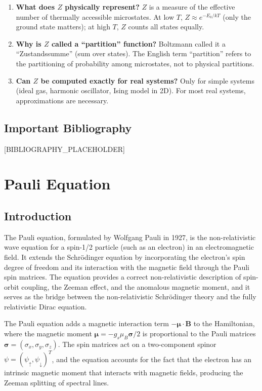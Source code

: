 \documentclass[11pt,openright]{book}
\begin{document}
\begin{enumerate}
\item \textbf{What does $Z$ physically represent?}
$Z$ is a measure of the effective number of thermally accessible microstates. At low $T$, $Z \approx e^{-E_{0}/kT}$ (only the ground state matters); at high $T$, $Z$ counts all states equally.

\item \textbf{Why is $Z$ called a ``partition'' function?}
Boltzmann called it a ``Zustandssumme'' (sum over states). The English term ``partition'' refers to the partitioning of probability among microstates, not to physical partitions.

\item \textbf{Can $Z$ be computed exactly for real systems?}
Only for simple systems (ideal gas, harmonic oscillator, Ising model in 2D). For most real systems, approximations are necessary.
\end{enumerate}
\section*{Important Bibliography}

[BIBLIOGRAPHY_PLACEHOLDER]


\chapter{Pauli Equation}

\section*{Introduction}

The Pauli equation, formulated by Wolfgang Pauli in 1927, is the non-relativistic wave equation for a spin-1/2 particle (such as an electron) in an electromagnetic field. It extends the Schrödinger equation by incorporating the electron's spin degree of freedom and its interaction with the magnetic field through the Pauli spin matrices. The equation provides a correct non-relativistic description of spin-orbit coupling, the Zeeman effect, and the anomalous magnetic moment, and it serves as the bridge between the non-relativistic Schrödinger theory and the fully relativistic Dirac equation.

The Pauli equation adds a magnetic interaction term $-\boldsymbol{\mu}\cdot\mathbf{B}$ to the Hamiltonian, where the magnetic moment $\boldsymbol{\mu} = -g_{s}\mu_{B}\boldsymbol{\sigma}/2$ is proportional to the Pauli matrices $\boldsymbol{\sigma} = (\sigma_{x}, \sigma_{y}, \sigma_{z})$. The spin matrices act on a two-component spinor $\psi = (\psi_{\uparrow}, \psi_{\downarrow})^{T}$, and the equation accounts for the fact that the electron has an intrinsic magnetic moment that interacts with magnetic fields, producing the Zeeman splitting of spectral lines.
\end{document}
